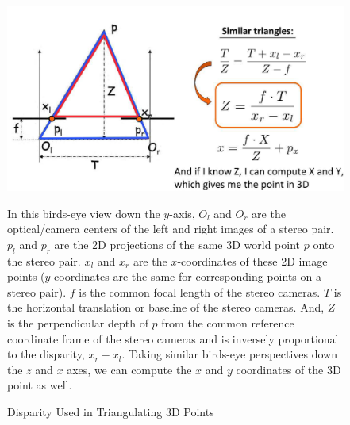 \begin{figure}[!h]
    \includegraphics[width=1\columnwidth]{figures/disparity-triangulation.png}
    \caption{Disparity Used in Triangulating 3D Points~\cite{fidler_depth_2021}}
    \label{fig:disparity-triangulation}
    {\small In this birds-eye view down the $y$-axis, $O_l$ and $O_r$ are the optical/camera centers of the left and right images of a stereo pair. $p_l$ and $p_r$ are the 2D projections of the same 3D world point $p$ onto the stereo pair. $x_l$ and $x_r$ are the $x$-coordinates of these 2D image points ($y$-coordinates are the same for corresponding points on a stereo pair). $f$ is the common focal length of the stereo cameras. $T$ is the horizontal translation or baseline of the stereo cameras. And, $Z$ is the perpendicular depth of $p$ from the common reference coordinate frame of the stereo cameras and is inversely proportional to the disparity, $x_r - x_l$. Taking similar birds-eye perspectives down the $z$ and $x$ axes, we can compute the $x$ and $y$ coordinates of the 3D point as well.}
\end{figure}

